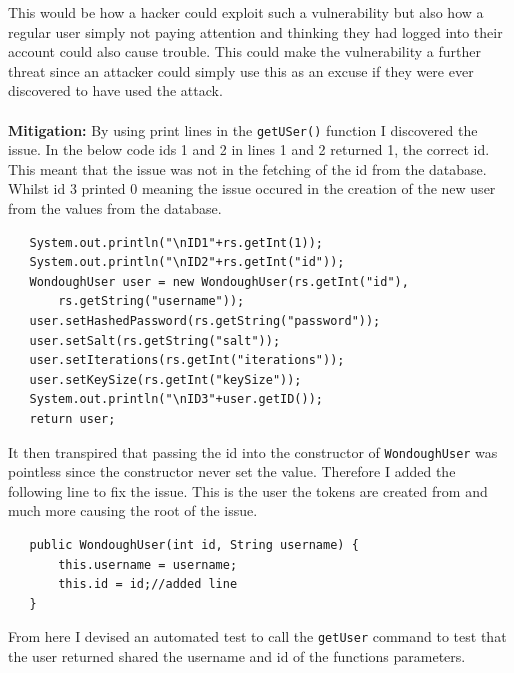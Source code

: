 This would be how a hacker could exploit such a vulnerability but also how a regular user simply not paying attention and thinking they had logged into their account could also
cause trouble. This could make the vulnerability a further threat since an attacker could simply use this as an excuse if they were ever discovered to have used the attack.\\ \\
\textbf{Mitigation:} By using print lines in the \verb|getUSer()| function I discovered the issue. In the below code ids 1 and 2 in lines 1 and 2 returned 1, the correct id. This
meant that the issue was not in the fetching of the id from the database. Whilst id 3 printed 0 meaning the issue occured in the creation of the new user from the values from
the database.
\begin{verbatim}
   System.out.println("\nID1"+rs.getInt(1));
   System.out.println("\nID2"+rs.getInt("id"));
   WondoughUser user = new WondoughUser(rs.getInt("id"),
       rs.getString("username"));
   user.setHashedPassword(rs.getString("password"));
   user.setSalt(rs.getString("salt"));
   user.setIterations(rs.getInt("iterations"));
   user.setKeySize(rs.getInt("keySize"));
   System.out.println("\nID3"+user.getID());
   return user;
\end{verbatim}
It then transpired that passing the id into the constructor of \verb|WondoughUser| was pointless since the constructor never set the value. Therefore I added the following line
to fix the issue. This is the user the tokens are created from and much more causing the root of the issue.
\begin{verbatim}
   public WondoughUser(int id, String username) {
       this.username = username;
       this.id = id;//added line
   }
\end{verbatim}
From here I devised an automated test to call the \verb|getUser| command to test that the user returned shared the username and id of the functions parameters.